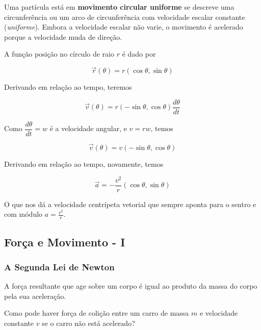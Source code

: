 Uma partícula está em \textbf{movimento circular uniforme} se descreve uma circunferência ou um arco de circunferência com velocidade escalar constante (\textit{uniforme}). Embora a velocidade escalar não varie, o movimento é acelerado porque a velocidade muda de direção.

A função posição no círculo de raio $r$ é dado por

\begin{equation}\label{14.5}
    \vec{r}(\theta) = r(\cos \theta, \sin \theta)
\end{equation}

Derivando em relação ao tempo, teremos

\begin{equation}\label{14.6}
    \vec{v}(\theta) = r(-\sin \theta, \cos \theta) \dfrac{d\theta}{dt}
\end{equation}

Como $\dfrac{d\theta}{dt}=w$ é a velocidade angular, e $v=rw$, temos

\begin{equation}\label{14.7}
    \vec{v}(\theta) = v(-\sin \theta, \cos \theta)
\end{equation}

Derivando em relação ao tempo, novamente, temos

\begin{equation}\label{14.8}
    \vec{a}=-\dfrac{v^2}{r}(\cos \theta, \sin \theta)
\end{equation}

O que nos dá a velocidade centrípeta vetorial que sempre aponta para o sentro e com módulo $a=\frac{v^2}{r}$.

\subsection{Força e Movimento - I}

\subsubsection{A Segunda Lei de Newton}

A força resultante que age sobre um corpo é igual ao produto da massa do corpo pela sua aceleração.

\begin{exe}
Como pode haver força de colição entre um carro de massa $m$ e velocidade constante $v$ se o carro não está acelerado?
\end{exe}

